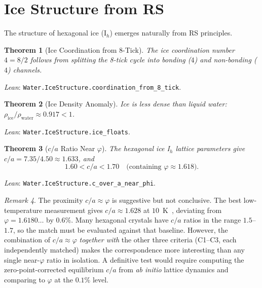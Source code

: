 \documentclass[12pt,a4paper]{article}
\newtheorem{theorem}{Theorem}[section]
\theoremstyle{definition}
\theoremstyle{remark}
\newtheorem{remark}[theorem]{Remark}
\begin{document}
\section{Ice Structure from RS}
\label{sec:ice}

The structure of hexagonal ice (I$_h$) emerges naturally from RS
principles.

\begin{theorem}[Ice Coordination from 8-Tick]
\label{thm:ice_coord}
The ice coordination number $4 = 8/2$ follows from splitting the
8-tick cycle into bonding ($4$) and non-bonding ($4$) channels.
\end{theorem}

\noindent
\textit{Lean}: \texttt{Water.IceStructure.coordination\_from\_8\_tick}.

\begin{theorem}[Ice Density Anomaly]
Ice is less dense than liquid water:
$\rho_{\mathrm{ice}}/\rho_{\mathrm{water}} \approx 0.917 < 1$.
\end{theorem}

\noindent
\textit{Lean}: \texttt{Water.IceStructure.ice\_floats}.

\begin{theorem}[$c/a$ Ratio Near $\varphi$]
\label{thm:ca_ratio}
The hexagonal ice I$_h$ lattice parameters give
$c/a = 7.35/4.50 \approx 1.633$, and
\begin{equation}
  1.60 < c/a < 1.70 \quad \text{(containing } \varphi \approx 1.618).
\end{equation}
\end{theorem}

\noindent
\textit{Lean}: \texttt{Water.IceStructure.c\_over\_a\_near\_phi}.

\begin{remark}
The proximity $c/a \approx \varphi$ is suggestive but not conclusive.
The best low-temperature measurement gives $c/a \approx 1.628$ at
$10$~K~\cite{Rottger1994}, deviating from $\varphi = 1.6180\ldots$
by $0.6\%$.  Many hexagonal crystals have $c/a$ ratios in the range
$1.5$--$1.7$, so the match must be evaluated against that baseline.
However, the combination of $c/a \approx \varphi$ \emph{together with}
the other three criteria (C1--C3, each independently matched) makes the
correspondence more interesting than any single near-$\varphi$ ratio
in isolation.  A definitive test would require computing the
zero-point-corrected equilibrium $c/a$ from \textit{ab initio}
lattice dynamics and comparing to $\varphi$ at the $0.1\%$ level.
\end{remark}
\end{document}
